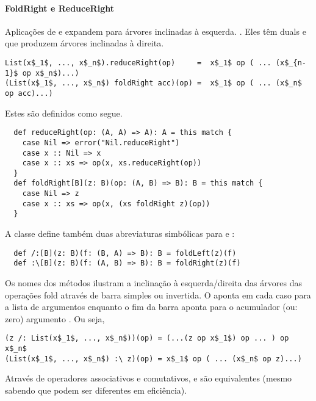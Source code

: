 \paragraph{FoldRight e ReduceRight}
Aplicações de  e  expandem para árvores inclinadas à esquerda. 
. Eles têm duals  e  que produzem 
árvores inclinadas à direita.
\begin{lstlisting}
List(x$_1$, ..., x$_n$).reduceRight(op)     =  x$_1$ op ( ... (x$_{n-1}$ op x$_n$)...)
(List(x$_1$, ..., x$_n$) foldRight acc)(op) =  x$_1$ op ( ... (x$_n$ op acc)...)
\end{lstlisting}
Estes são definidos como segue.
\begin{lstlisting}
  def reduceRight(op: (A, A) => A): A = this match {
    case Nil => error("Nil.reduceRight")
    case x :: Nil => x
    case x :: xs => op(x, xs.reduceRight(op))
  }
  def foldRight[B](z: B)(op: (A, B) => B): B = this match {
    case Nil => z
    case x :: xs => op(x, (xs foldRight z)(op))
  }
\end{lstlisting}
A classe   define também duas abreviaturas simbólicas para 
e :
\begin{lstlisting}
  def /:[B](z: B)(f: (B, A) => B): B = foldLeft(z)(f)
  def :\[B](z: B)(f: (A, B) => B): B = foldRight(z)(f)
\end{lstlisting}
Os nomes dos métodos ilustram a inclinação à esquerda/direita das árvores das operações 
fold através de barra simples ou invertida. O \code{:} aponta em cada caso para a lista 
de argumentos enquanto o fim da barra aponta para o acumulador (ou: zero) argumento .
Ou seja,  
\begin{lstlisting}
(z /: List(x$_1$, ..., x$_n$))(op) = (...(z op x$_1$) op ... ) op x$_n$ 
(List(x$_1$, ..., x$_n$) :\ z)(op) = x$_1$ op ( ... (x$_n$ op z)...)
\end{lstlisting}
Através de operadores associativos e comutativos, \code{/:} e \code{:\\} são equivalentes
(mesmo sabendo que podem ser diferentes em eficiência).


